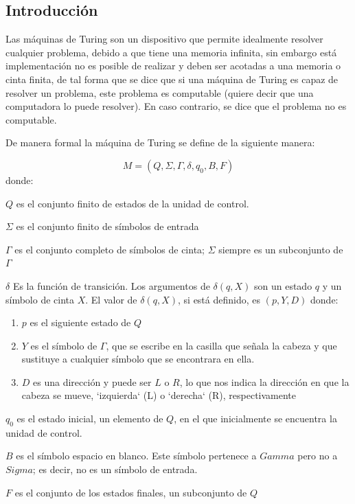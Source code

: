 \subsection{Introducción}
	Las máquinas de Turing son un dispositivo que permite idealmente resolver cualquier problema, debido a que tiene una memoria infinita, sin embargo está implementación no es posible de realizar y deben ser acotadas a una memoria o cinta finita, de tal forma que se dice que si una máquina de Turing es capaz de resolver un problema, este problema es computable (quiere decir que una computadora lo puede resolver). En caso contrario, se dice que el problema no es computable.\cite{LIBRO}
	
	
	De manera formal la máquina de Turing se define de la siguiente manera:

	\[ M=(Q, \Sigma, \Gamma, \delta, q_0, B, F) \]
	donde:
	\begin{description}
	 \item $Q$ es el conjunto finito de estados de la unidad de control.
	 \item $ \Sigma $ es el conjunto finito de símbolos de entrada
	 \item $ \Gamma $ es el conjunto completo de símbolos de cinta; $ \Sigma $ siempre es un subconjunto de $\Gamma$
	 \item $\delta$ Es la función de transición. Los argumentos de $\delta(q, X)$ son un estado $q$ y un símbolo de cinta $X$. El valor de $\delta(q, X)$, si está definido, es $(p, Y, D)$ donde:
	 \begin{enumerate}
	  \item $p$ es el siguiente estado de $Q$
	  \item $Y$ es el símbolo de $\Gamma$, que se escribe en la casilla que señala la cabeza y que sustituye a cualquier símbolo que se encontrara en ella.
	  \item $D$ es una dirección y puede ser $L$ o $ R$, lo que nos indica la dirección en que la cabeza se mueve, `izquierda` (L) o `derecha` (R), respectivamente
	 \end{enumerate}
	 \item $q_0$ es el estado inicial, un elemento de $Q$, en el que inicialmente se encuentra la unidad de control.
	 \item $B$ es el símbolo espacio en blanco. Este símbolo pertenece a $Gamma$ pero no a $Sigma$; es decir, no es un símbolo de entrada.
	 \item $F$ es el conjunto de los estados finales, un subconjunto de $Q$
	\end{description}


